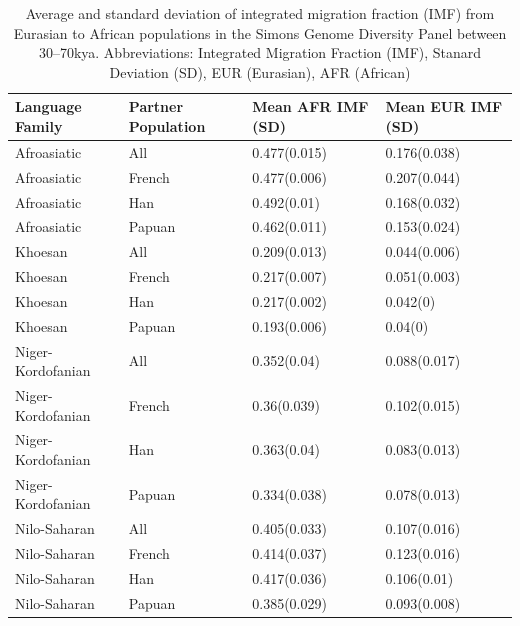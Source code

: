 \documentclass{article}
\begin{document}
\begin{table}[ht]
\centering
\begin{tabular}{llll}
  \hline
Language Family & Partner Population & Mean AFR IMF (SD) & Mean EUR IMF (SD) \\ 
  \hline
Afroasiatic & All & 0.477(0.015) & 0.176(0.038) \\ 
  Afroasiatic & French & 0.477(0.006) & 0.207(0.044) \\ 
  Afroasiatic & Han & 0.492(0.01) & 0.168(0.032) \\ 
  Afroasiatic & Papuan & 0.462(0.011) & 0.153(0.024) \\ 
  Khoesan & All & 0.209(0.013) & 0.044(0.006) \\ 
  Khoesan & French & 0.217(0.007) & 0.051(0.003) \\ 
  Khoesan & Han & 0.217(0.002) & 0.042(0) \\ 
  Khoesan & Papuan & 0.193(0.006) & 0.04(0) \\ 
  Niger-Kordofanian & All & 0.352(0.04) & 0.088(0.017) \\ 
  Niger-Kordofanian & French & 0.36(0.039) & 0.102(0.015) \\ 
  Niger-Kordofanian & Han & 0.363(0.04) & 0.083(0.013) \\ 
  Niger-Kordofanian & Papuan & 0.334(0.038) & 0.078(0.013) \\ 
  Nilo-Saharan & All & 0.405(0.033) & 0.107(0.016) \\ 
  Nilo-Saharan & French & 0.414(0.037) & 0.123(0.016) \\ 
  Nilo-Saharan & Han & 0.417(0.036) & 0.106(0.01) \\ 
  Nilo-Saharan & Papuan & 0.385(0.029) & 0.093(0.008) \\ 
   \hline
\end{tabular}
\caption{Average and standard deviation of integrated migration fraction (IMF) from Eurasian to African populations in the Simons Genome Diversity Panel between 30--70kya. Abbreviations: Integrated Migration Fraction (IMF), Stanard Deviation (SD), EUR (Eurasian), AFR (African)} 
\label{average_sgdp_migration_table}
\end{table}
\end{document}
